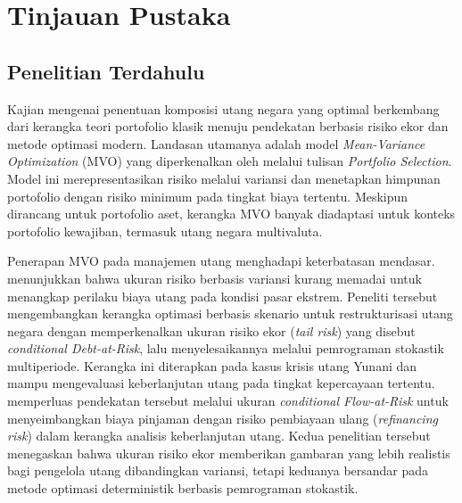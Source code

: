 \chapter{Tinjauan Pustaka}\label{ch:literature}


\section{Penelitian Terdahulu}\label{sec:past-research} Kajian mengenai penentuan komposisi utang negara yang optimal berkembang dari kerangka teori portofolio klasik menuju pendekatan berbasis risiko ekor dan metode optimasi modern. Landasan utamanya adalah model \textit{Mean-Variance Optimization} (MVO) yang diperkenalkan oleh  melalui tulisan \textit{Portfolio Selection}. Model ini merepresentasikan risiko melalui variansi dan menetapkan himpunan portofolio dengan risiko minimum pada tingkat biaya tertentu. Meskipun dirancang untuk portofolio aset, kerangka MVO banyak diadaptasi untuk konteks portofolio kewajiban, termasuk utang negara multivaluta.

Penerapan MVO pada manajemen utang menghadapi keterbatasan mendasar.  menunjukkan bahwa ukuran risiko berbasis variansi kurang memadai untuk menangkap perilaku biaya utang pada kondisi pasar ekstrem. Peneliti tersebut mengembangkan kerangka optimasi berbasis skenario untuk restrukturisasi utang negara dengan memperkenalkan ukuran risiko ekor (\textit{tail risk}) yang disebut \textit{conditional Debt-at-Risk}, lalu menyelesaikannya melalui pemrograman stokastik multiperiode. Kerangka ini diterapkan pada kasus krisis utang Yunani dan mampu mengevaluasi keberlanjutan utang pada tingkat kepercayaan tertentu.  memperluas pendekatan tersebut melalui ukuran \textit{conditional Flow-at-Risk} untuk menyeimbangkan biaya pinjaman dengan risiko pembiayaan ulang (\textit{refinancing risk}) dalam kerangka analisis keberlanjutan utang. Kedua penelitian tersebut menegaskan bahwa ukuran risiko ekor memberikan gambaran yang lebih realistis bagi pengelola utang dibandingkan variansi, tetapi keduanya bersandar pada metode optimasi deterministik berbasis pemrograman stokastik.

